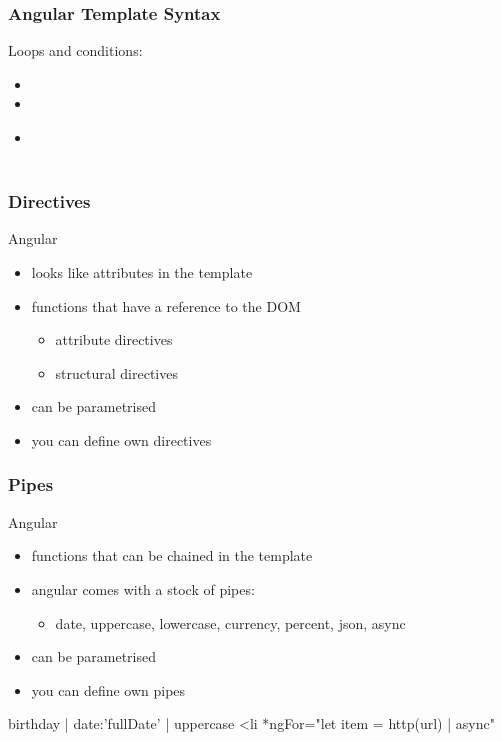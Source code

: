 \begin{frame}[fragile] \frametitle{Angular Template Syntax}
Loops and conditions:
\begin{itemize}
  \item {}
  \item {}
  \item {}\\
   \hspace{3mm} \\
   \hspace{3mm} 
\end{itemize}
\end{frame}

\begin{frame}[fragile] \frametitle{Directives}
Angular
\begin{itemize}
  \item looks like attributes in the template
  \item functions that have a reference to the DOM
  \begin{itemize}
    \item attribute directives
    \item structural directives
  \end{itemize}
  \item can be parametrised
  \item you can define own directives
\end{itemize}
\end{frame}

\begin{frame}[fragile] \frametitle{Pipes}
Angular
\begin{itemize}
  \item functions that can be chained in the template
  \item angular comes with a stock of pipes:
  \begin{itemize}
    \item  date, uppercase, lowercase, currency, percent, json, async
  \end{itemize}
  \item can be parametrised
  \item you can define own pipes
\end{itemize}
\begin{CodeBox}{}
{{  birthday | date:'fullDate' | uppercase}}
{{  <li *ngFor="let item = http(url) | async"}}
\end{CodeBox}
\end{frame}

